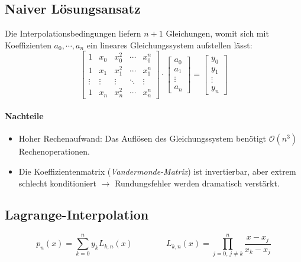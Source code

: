         \subsection{Naiver Lösungsansatz}
            Die Interpolationsbedingungen liefern \( n + 1 \) Gleichungen, womit sich mit Koeffizienten \( a_0, \cdots, a_n \) ein lineares Gleichungssystem aufstellen lässt:
            \begin{equation*}
	            \begin{bmatrix}
	            	1      & x_0    & x_0^2  & \cdots & x_0^n  \\
	            	1      & x_1    & x_1^2  & \cdots & x_1^n  \\
	            	\vdots & \vdots & \vdots & \ddots & \vdots \\
	            	1      & x_n    & x_n^2  & \cdots & x_n^n
	            \end{bmatrix}
	            \cdot
	            \begin{bmatrix}
		            a_0 \\
		            a_1 \\
		            \vdots \\
		            a_n
	            \end{bmatrix}
	            =
	            \begin{bmatrix}
		            y_0 \\
		            y_1 \\
		            \vdots \\
		            y_n
	            \end{bmatrix}
            \end{equation*}
            
            \paragraph{Nachteile}
	            \begin{itemize}
	            	\item Hoher Rechenaufwand: Das Auflösen des Gleichungssystem benötigt \( \mathcal{O}(n^3) \) Rechenoperationen.
	            	\item Die Koeffizientenmatrix (\textit{Vandermonde-Matrix}) ist invertierbar, aber extrem schlecht konditioniert \(\rightarrow\) Rundungsfehler werden dramatisch verstärkt.
	            \end{itemize}

        \subsection{Lagrange-Interpolation}
            \begin{equation*}
	            p_n(x) = \sum_{k = 0}^n y_k L_{k,n}(x) \qquad\qquad L_{k,n}(x) = \prod_{j = 0,\, j \neq k}^n \frac{x - x_j}{x_k - x_j}
            \end{equation*}
            
